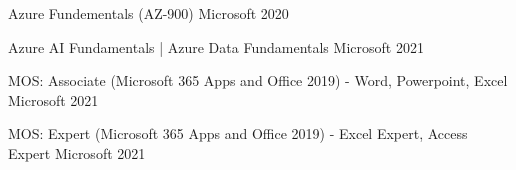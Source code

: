



\begin{cvhonors}

  \cvcert
  {Azure Fundementals (AZ-900)} %
  {Microsoft} %
  {2020} %

  \cvcert
  {Azure AI Fundamentals | Azure Data Fundamentals} %
  {Microsoft} %
  {2021} %

\end{cvhonors}




\begin{cvhonors}

  \cvcert
  {MOS: Associate (Microsoft 365 Apps and Office 2019) - Word, Powerpoint, Excel} %
  {Microsoft} %
  {2021} %

  \cvcert
  {MOS: Expert (Microsoft 365 Apps and Office 2019) - Excel Expert, Access Expert} %
  {Microsoft} %
  {2021} %

\end{cvhonors}
